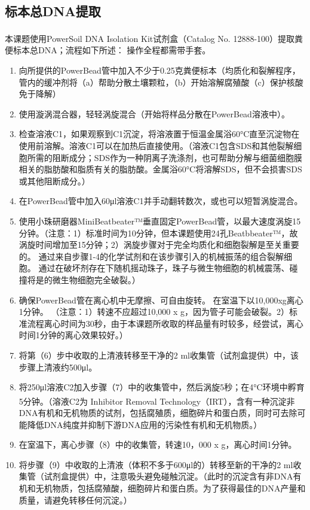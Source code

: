   \subsection{标本总DNA提取}
  \label{标本总DNA提取}
  本课题使用PowerSoil\textsuperscript{\textregistered} DNA Isolation Kit试剂盒（Catalog No. 12888-100）提取粪便标本总DNA；流程如下所述：
  操作全程都需带手套。
    \begin{enumerate}
      \item 向所提供的PowerBead管中加入不少于0.25克粪便标本（均质化和裂解程序，管内的缓冲剂将（a）帮助分散土壤颗粒，（b）开始溶解腐殖酸（c）保护核酸免于降解）
      \item 使用漩涡混合器，轻轻涡旋混合（开始将样品分散在PowerBead溶液中）。
      \item 检查溶液C1，如果观察到C1沉淀，将溶液置于恒温金属浴60°C直至沉淀物在使用前溶解。溶液C1可以在加热后直接使用。（溶液C1包含SDS和其他裂解细胞所需的阻断成分；SDS作为一种阴离子洗涤剂，也可帮助分解与细菌细胞膜相关的脂肪酸和脂质有关的脂肪酸。金属浴60°C将溶解SDS，但不会损害SDS或其他阻断成分。）
      \item 在PowerBead管中加入60μl溶液C1并手动翻转数次，或也可以短暂涡旋混合。
      \item 使用小珠研磨器MiniBeatbeater™垂直固定PowerBead管，以最大速度涡旋15分钟。（注意：1）标准时间为10分钟，但本课题使用24孔Beatbbeater™，故涡旋时间增加至15分钟；2）涡旋步骤对于完全均质化和细胞裂解是至关重要的。 通过来自步骤1-4的化学试剂和在该步骤引入的机械振荡的组合裂解细胞。 通过在破坏剂存在下随机摇动珠子，珠子与微生物细胞的机械震荡、碰撞将是的微生物细胞完全破裂。）
      \item 确保PowerBead管在离心机中无摩擦、可自由旋转。 在室温下以10,000xg离心1分钟。 （注意：1）转速不应超过10,000 x g，因为管子可能会破裂。2）标准流程离心时间为30秒，由于本课题所收取的样品量有时较多，经尝试，离心时间1分钟的离心效果较好。）
      \item 将第（6）步中收取的上清液转移至干净的2 ml收集管（试剂盒提供）中，该步骤上清液约500μl。
      \item 将250μl溶液C2加入步骤（7）中的收集管中，然后涡旋5秒；在4°C环境中孵育5分钟。（溶液C2为 Inhibitor Removal Technology\textsuperscript{\textregistered}（IRT），含有一种沉淀非DNA有机和无机物质的试剂，包括腐殖质，细胞碎片和蛋白质，同时可去除可能降低DNA纯度并抑制下游DNA应用的污染性有机和无机物质。）
      \item 在室温下，离心步骤（8）中的收集管，转速10，000 x g，离心时间1分钟。
      \item 将步骤（9）中收取的上清液（体积不多于600μl的）转移至新的干净的2 ml收集管（试剂盒提供）中，注意吸头避免碰触沉淀。（此时的沉淀含有非DNA有机和无机物质，包括腐殖酸，细胞碎片和蛋白质。为了获得最佳的DNA产量和质量，请避免转移任何沉淀。）

\end{enumerate}
